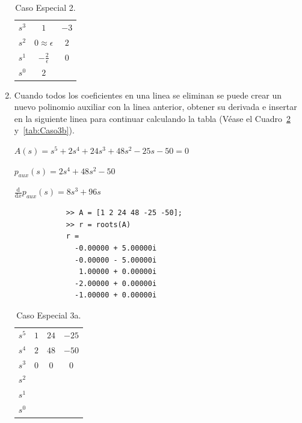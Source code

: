 \begin{enumerate}
            \begin{table}[htbp]
                \centering
                \begin{tabular}{c|c c}
                $s^3$ & $1$ & $-3$ \\
                $s^2$ & $0\approx\epsilon$ & $2$ \\
                $s^1$ & $-\frac{2}{\epsilon}$ & $0$ \\
                $s^0$ & $2$
                \end{tabular}
                \caption{\label{tab:Caso2}Caso Especial 2.}
            \end{table}

            \item Cuando todos los coeficientes en una linea se eliminan se puede crear un nuevo polinomio auxiliar con la linea anterior, obtener su derivada e insertar en la siguiente linea para continuar calculando la tabla (Véase el Cuadro~\ref{tab:Caso3a} y~\ref{tab:Caso3b}).

            \begin{math}
            A(s) = s^5 + 2 s^4 + 24 s^3 + 48 s^2 - 25 s - 50 = 0
            \end{math}

            \begin{math}
            p_{aux}(s) = 2 s^4 + 48 s^2 - 50
            \end{math}

            \begin{math}
            \frac{\mathrm d}{\mathrm d x} p_{aux}(s) = 8 s^3 + 96 s
            \end{math}

            \begin{verbatim}
            >> A = [1 2 24 48 -25 -50];
            >> r = roots(A)
            r =
              -0.00000 + 5.00000i
              -0.00000 - 5.00000i
               1.00000 + 0.00000i
              -2.00000 + 0.00000i
              -1.00000 + 0.00000i
            \end{verbatim}

            \begin{table}[htbp]
                \centering
                \begin{tabular}{c|c c c}
                $s^5$ & $1$ & $24$ & $-25$ \\
                $s^4$ & $2$ & $48$ & $-50$ \\
                $s^3$ & $0$ & $0$  & $0$   \\
                $s^2$ \\
                $s^1$ \\
                $s^0$
                \end{tabular}
                \caption{\label{tab:Caso3a}Caso Especial 3a.}
            \end{table}


\end{enumerate}
